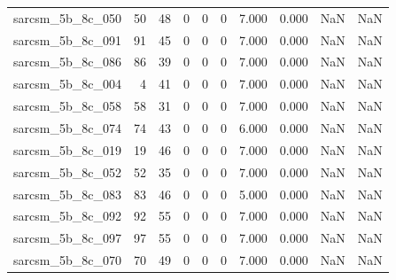 \documentclass{article}
\begin{document}
\begin{longtable}{lrrrrrrrrr}
sarcsm\_5b\_8c\_050 & 50 & 48 & 0 & 0 & 0 & 7.000 & 0.000 & NaN & NaN \\
sarcsm\_5b\_8c\_091 & 91 & 45 & 0 & 0 & 0 & 7.000 & 0.000 & NaN & NaN \\
sarcsm\_5b\_8c\_086 & 86 & 39 & 0 & 0 & 0 & 7.000 & 0.000 & NaN & NaN \\
sarcsm\_5b\_8c\_004 & 4 & 41 & 0 & 0 & 0 & 7.000 & 0.000 & NaN & NaN \\
sarcsm\_5b\_8c\_058 & 58 & 31 & 0 & 0 & 0 & 7.000 & 0.000 & NaN & NaN \\
sarcsm\_5b\_8c\_074 & 74 & 43 & 0 & 0 & 0 & 6.000 & 0.000 & NaN & NaN \\
sarcsm\_5b\_8c\_019 & 19 & 46 & 0 & 0 & 0 & 7.000 & 0.000 & NaN & NaN \\
sarcsm\_5b\_8c\_052 & 52 & 35 & 0 & 0 & 0 & 7.000 & 0.000 & NaN & NaN \\
sarcsm\_5b\_8c\_083 & 83 & 46 & 0 & 0 & 0 & 5.000 & 0.000 & NaN & NaN \\
sarcsm\_5b\_8c\_092 & 92 & 55 & 0 & 0 & 0 & 7.000 & 0.000 & NaN & NaN \\
sarcsm\_5b\_8c\_097 & 97 & 55 & 0 & 0 & 0 & 7.000 & 0.000 & NaN & NaN \\
sarcsm\_5b\_8c\_070 & 70 & 49 & 0 & 0 & 0 & 7.000 & 0.000 & NaN & NaN \\
\end{longtable}
\end{document}
